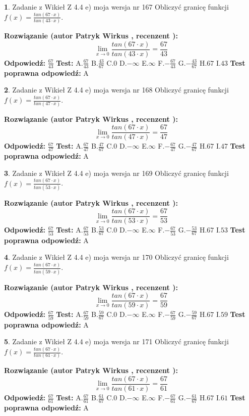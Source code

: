\documentclass[12pt, a4paper]{article}
\theoremstyle{definition} %
\newtheorem{zad}{}
\newcommand{\zadStart}[1]{\begin{zad}#1\newline}
\newcommand{\zadStop}{\end{zad}}
\newcommand{\rozwStart}[2]{\noindent \textbf{Rozwiązanie (autor #1 , recenzent #2): }\newline}
\newcommand{\rozwStop}{\newline}
\newcommand{\odpStart}{\noindent \textbf{Odpowiedź:}\newline}
\newcommand{\odpStop}{\newline}
\newcommand{\testStart}{\noindent \textbf{Test:}\newline}
\newcommand{\testStop}{\newline}
\newcommand{\kluczStart}{\noindent \textbf{Test poprawna odpowiedź:}\newline}
\newcommand{\kluczStop}{\newline}
\begin{document}
\zadStart{Zadanie z Wikieł Z 4.4 e) moja wersja nr 167}
Obliczyć granicę funkcji $f(x)=\frac{tan(67\cdot x)}{tan(43\cdot x)}$.
\zadStop
\rozwStart{Patryk Wirkus}{}
$$\lim\limits_{x\to 0}\frac{tan(67\cdot x)}{tan(43\cdot x)}=
\frac{67}{43}$$
\rozwStop
\odpStart
$\frac{67}{43}$
\odpStop
\testStart
A.$\frac{67}{43}$
B.$\frac{43}{67}$
C.$0$
D.$-\infty$
E.$\infty$
F.$-\frac{67}{43}$
G.$-\frac{43}{67}$
H.$67$
I.$43$
\testStop
\kluczStart
A
\kluczStop



\zadStart{Zadanie z Wikieł Z 4.4 e) moja wersja nr 168}
Obliczyć granicę funkcji $f(x)=\frac{tan(67\cdot x)}{tan(47\cdot x)}$.
\zadStop
\rozwStart{Patryk Wirkus}{}
$$\lim\limits_{x\to 0}\frac{tan(67\cdot x)}{tan(47\cdot x)}=
\frac{67}{47}$$
\rozwStop
\odpStart
$\frac{67}{47}$
\odpStop
\testStart
A.$\frac{67}{47}$
B.$\frac{47}{67}$
C.$0$
D.$-\infty$
E.$\infty$
F.$-\frac{67}{47}$
G.$-\frac{47}{67}$
H.$67$
I.$47$
\testStop
\kluczStart
A
\kluczStop



\zadStart{Zadanie z Wikieł Z 4.4 e) moja wersja nr 169}
Obliczyć granicę funkcji $f(x)=\frac{tan(67\cdot x)}{tan(53\cdot x)}$.
\zadStop
\rozwStart{Patryk Wirkus}{}
$$\lim\limits_{x\to 0}\frac{tan(67\cdot x)}{tan(53\cdot x)}=
\frac{67}{53}$$
\rozwStop
\odpStart
$\frac{67}{53}$
\odpStop
\testStart
A.$\frac{67}{53}$
B.$\frac{53}{67}$
C.$0$
D.$-\infty$
E.$\infty$
F.$-\frac{67}{53}$
G.$-\frac{53}{67}$
H.$67$
I.$53$
\testStop
\kluczStart
A
\kluczStop



\zadStart{Zadanie z Wikieł Z 4.4 e) moja wersja nr 170}
Obliczyć granicę funkcji $f(x)=\frac{tan(67\cdot x)}{tan(59\cdot x)}$.
\zadStop
\rozwStart{Patryk Wirkus}{}
$$\lim\limits_{x\to 0}\frac{tan(67\cdot x)}{tan(59\cdot x)}=
\frac{67}{59}$$
\rozwStop
\odpStart
$\frac{67}{59}$
\odpStop
\testStart
A.$\frac{67}{59}$
B.$\frac{59}{67}$
C.$0$
D.$-\infty$
E.$\infty$
F.$-\frac{67}{59}$
G.$-\frac{59}{67}$
H.$67$
I.$59$
\testStop
\kluczStart
A
\kluczStop



\zadStart{Zadanie z Wikieł Z 4.4 e) moja wersja nr 171}
Obliczyć granicę funkcji $f(x)=\frac{tan(67\cdot x)}{tan(61\cdot x)}$.
\zadStop
\rozwStart{Patryk Wirkus}{}
$$\lim\limits_{x\to 0}\frac{tan(67\cdot x)}{tan(61\cdot x)}=
\frac{67}{61}$$
\rozwStop
\odpStart
$\frac{67}{61}$
\odpStop
\testStart
A.$\frac{67}{61}$
B.$\frac{61}{67}$
C.$0$
D.$-\infty$
E.$\infty$
F.$-\frac{67}{61}$
G.$-\frac{61}{67}$
H.$67$
I.$61$
\testStop
\kluczStart
A
\kluczStop
\end{document}
